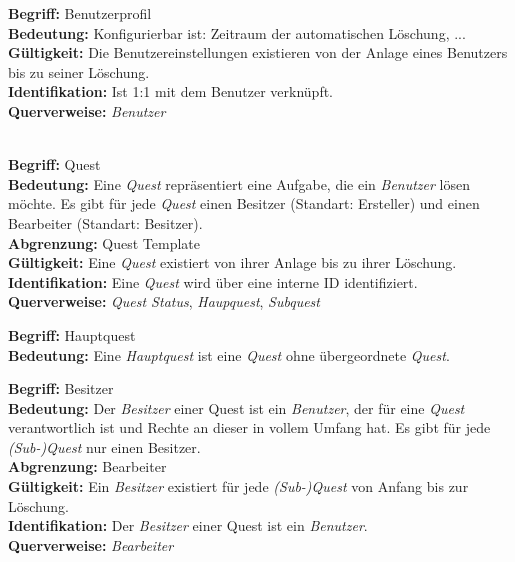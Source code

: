 \documentclass{article}
\begin{document}
\begin{samepage}
\textbf{Begriff:} Benutzerprofil \\
\textbf{Bedeutung:} Konfigurierbar ist: Zeitraum der automatischen Löschung, ... \\
\textbf{Gültigkeit:} Die Benutzereinstellungen existieren von der Anlage eines Benutzers bis zu seiner Löschung. \\
\textbf{Identifikation:} Ist 1:1 mit dem Benutzer verknüpft. \\
\textbf{Querverweise:} \textit{Benutzer} \\ \\
\end{samepage}

\begin{samepage}
\textbf{Begriff:} Quest \\
\textbf{Bedeutung:} Eine \textit{Quest} repräsentiert eine Aufgabe, die ein \textit{Benutzer} lösen möchte. Es gibt für jede \textit{Quest} einen Besitzer (Standart: Ersteller) und einen Bearbeiter (Standart: Besitzer). \\
\textbf{Abgrenzung:} Quest Template \\
\textbf{Gültigkeit:} Eine \textit{Quest} existiert von ihrer Anlage bis zu ihrer Löschung. \\
\textbf{Identifikation:} Eine \textit{Quest} wird über eine interne ID identifiziert. \\
\textbf{Querverweise:} \textit{Quest Status}, \textit{Haupquest}, \textit{Subquest} \\
\end{samepage}

\begin{samepage}
\textbf{Begriff:} Hauptquest \\
\textbf{Bedeutung:} Eine \textit{Hauptquest} ist eine \textit{Quest} ohne übergeordnete \textit{Quest}. \\
\end{samepage}

\begin{samepage}
\textbf{Begriff:} Besitzer \\
\textbf{Bedeutung:} Der \textit{Besitzer} einer Quest ist ein \textit{Benutzer}, der für eine \textit{Quest} verantwortlich ist und Rechte an dieser in vollem Umfang hat. Es gibt für jede \textit{(Sub-)Quest} nur einen Besitzer. \\
\textbf{Abgrenzung:} Bearbeiter \\
\textbf{Gültigkeit:} Ein \textit{Besitzer} existiert für jede \textit{(Sub-)Quest} von Anfang bis zur Löschung. \\
\textbf{Identifikation:} Der \textit{Besitzer} einer Quest ist ein \textit{Benutzer}. \\
\textbf{Querverweise:} \textit{Bearbeiter} \\ \\
\end{samepage}
\end{document}
